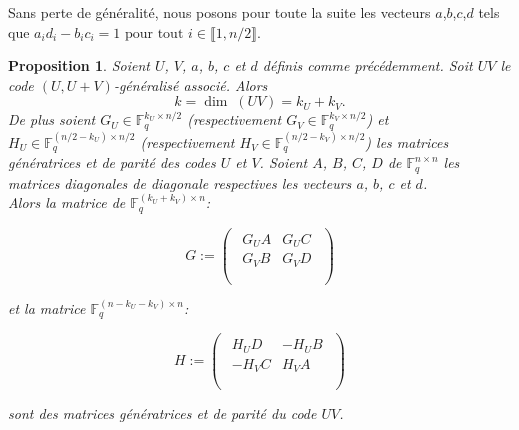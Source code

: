 \documentclass[12pt]{article}
\theoremstyle{plain}
\newtheorem{propo}[thm]{Proposition}
\theoremstyle{definition}
\newcommand{\F}{\mathbb{F}}
\begin{document}
\noindent Sans perte de généralité, nous posons pour toute la suite les vecteurs $a$,$b$,$c$,$d$ tels que $a_id_i - b_ic_i = 1 \text{ pour tout } i \in \llbracket 1,n/2\rrbracket$. \\

\begin{propo} Soient $U$, $V$, $a$, $b$, $c$ et $d$ définis comme précédemment. Soit $UV$ le code $(U,U+V)$-généralisé associé. Alors
$$ k = \dim\; (UV) = k_U + k_V.$$
De plus soient $G_U \in \F_q^{k_U \times n/2}$ (respectivement $G_V \in \F_q^{k_V \times n/2}$) et $H_U \in \F_q^{(n/2-k_U) \times n/2}$ (respectivement $H_V \in \F_q^{(n/2-k_V) \times n/2}$) les matrices génératrices et de parité des codes $U$ et $V$. Soient $A$, $B$, $C$, $D$ de $\F_q^{n \times n}$ les matrices diagonales de diagonale respectives les vecteurs $a$, $b$, $c$ et $d$.  \\
\vspace{0.2in}
Alors la matrice de $\F_q^{(k_U + k_V) \times n}$: 

\vspace{0.1in}

$$
G := 
\begin{pmatrix}
\begin{array}{c|c}
G_UA & G_UC \\
 \hline 
G_VB & G_VD \\
\end{array} \\
\end{pmatrix}
$$

\noindent et la matrice $\F_q^{(n - k_U - k_V) \times n}$:

\vspace{0.1in}
$$ 
H :=
\begin{pmatrix}
\begin{array}{c|c}
H_UD & -H_UB \\
 \hline 
-H_VC & H_VA \\
\end{array} \\
\end{pmatrix}
$$
\vspace{0.1in}

\noindent sont des matrices génératrices et de parité du code $UV$. 
\end{propo}
\end{document}
